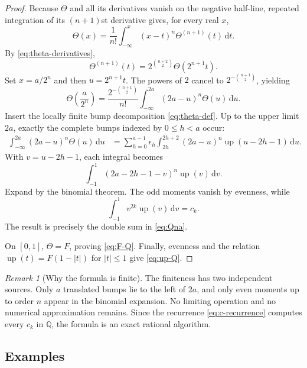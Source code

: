 \documentclass[11pt]{article}
\numberwithin{equation}{section}
\theoremstyle{definition}
\theoremstyle{remark}
\newtheorem{remark}[theorem]{Remark}
\newcommand{\Q}{\mathbb{Q}}
\newcommand{\dd}{\,\mathrm{d}}
\newcommand{\upf}{\operatorname{up}}
\newcommand{\Th}{\Theta}
\begin{document}
\begin{proof}
Because $\Th$ and all its derivatives vanish on the negative half-line,
repeated integration of its $(n+1)$st derivative gives, for every real $x$,
\begin{equation}\label{eq:theta-repeated-integral}
 \Th(x)=\frac1{n!}\int_{-\infty}^{x}(x-t)^n\Th^{(n+1)}(t)\dd t.
\end{equation}
By \eqref{eq:theta-derivatives},
\[
 \Th^{(n+1)}(t)=2^{\binom{n+2}{2}}\Th(2^{n+1}t).
\]
Set $x=a/2^n$ and then $u=2^{n+1}t$.  The powers of $2$ cancel to
$2^{-\binom{n+1}{2}}$, yielding
\begin{equation}\label{eq:theta-integral-a}
 \Th\left(\frac{a}{2^n}\right)
 =\frac{2^{-\binom{n+1}{2}}}{n!}
  \int_{-\infty}^{2a}(2a-u)^n\Th(u)\dd u.
\end{equation}
Insert the locally finite bump decomposition \eqref{eq:theta-def}.  Up to the
upper limit $2a$, exactly the complete bumps indexed by $0\le h<a$ occur:
\begin{align*}
 \int_{-\infty}^{2a}(2a-u)^n\Th(u)\dd u
 &=\sum_{h=0}^{a-1}\epsilon_h
   \int_{2h}^{2h+2}(2a-u)^n\upf(u-2h-1)\dd u.
\end{align*}
With $v=u-2h-1$, each integral becomes
\[
 \int_{-1}^{1}(2a-2h-1-v)^n\upf(v)\dd v.
\]
Expand by the binomial theorem.  The odd moments vanish by evenness, while
\[
 \int_{-1}^{1}v^{2k}\upf(v)\dd v=c_k.
\]
The result is precisely the double sum in \eqref{eq:Qna}.

On $[0,1]$, $\Th=F$, proving \eqref{eq:F-Q}.  Finally, evenness and the
relation $\upf(t)=F(1-|t|)$ for $|t|\le1$ give
\eqref{eq:up-Q}.
\end{proof}

\begin{remark}[Why the formula is finite]
The finiteness has two independent sources.  Only $a$ translated bumps lie
to the left of $2a$, and only even moments up to order $n$ appear in the
binomial expansion.  No limiting operation and no numerical approximation
remains.  Since the recurrence \eqref{eq:c-recurrence} computes every $c_k$
in $\Q$, the formula is an exact rational algorithm.
\end{remark}

\subsection{Examples}
\end{document}
